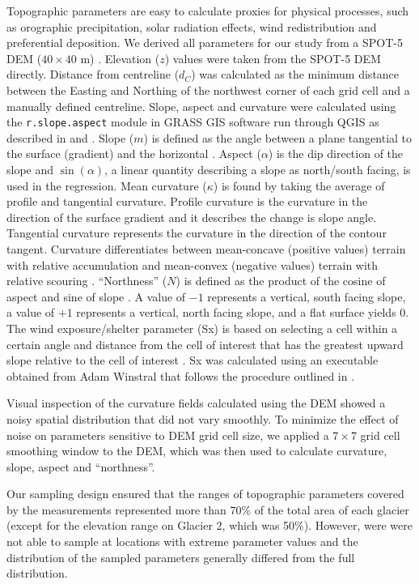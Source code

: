 \documentclass[review,oneside, letterpaper]{igs}
\begin{document}
Topographic parameters are easy to calculate proxies for physical processes, such as orographic precipitation, solar radiation effects, wind redistribution and preferential deposition. We derived all parameters for our study from a SPOT-5 DEM ($40\times40$ m) \citep{Korona2009}. Elevation ($z$) values were taken from the SPOT-5 DEM directly. Distance from centreline ($d_C$) was calculated as the minimum distance between the Easting and Northing of the northwest corner of each grid cell and a manually defined centreline. Slope, aspect and curvature were calculated using the \texttt{r.slope.aspect} module in GRASS GIS software run through QGIS as described in \cite{Mitavsova1993} and \cite{Hofierka2009}. Slope ($m$) is defined as the angle between a plane tangential to the surface (gradient) and the horizontal \citep{Olaya2009}. Aspect ($\alpha$) is the dip direction of the slope and $\sin(\alpha)$, a linear quantity describing a slope as north/south facing, is used in the regression. Mean curvature ($\kappa$) is found by taking the average of profile and tangential curvature. Profile curvature is the curvature in the direction of the surface gradient and it describes the change is slope angle. Tangential curvature represents the curvature in the direction of the contour tangent. Curvature differentiates between mean-concave (positive values) terrain with relative accumulation and mean-convex (negative values) terrain with relative scouring \citep{Olaya2009}. ``Northness'' ($N$) is defined as the product of the cosine of aspect and sine of slope \citep{Molotch2005}. A value of $-1$ represents a vertical, south facing slope, a value of $+1$ represents a vertical, north facing slope, and a flat surface yields 0. The wind exposure/shelter parameter (Sx) is based on selecting a cell within a certain angle and distance from the cell of interest that has the greatest upward slope relative to the cell of interest \citep{Winstral2002}. Sx was calculated using an executable obtained from Adam Winstral that follows the procedure outlined in \cite{Winstral2002}. 

Visual inspection of the curvature fields calculated using the DEM showed a noisy spatial
distribution that did not vary smoothly. To minimize the effect of noise on parameters sensitive to DEM grid cell size, we applied a $7\times7$ grid cell smoothing window to the DEM, which was then used to calculate curvature, slope, aspect and ``northness''.

Our sampling design ensured that the ranges of topographic parameters covered by the measurements represented more than 70\% of the total area of each glacier (except for the elevation range on Glacier 2, which was 50\%). However, were were not able to sample at locations with extreme parameter values and the distribution of the sampled parameters generally differed from the full distribution.
\end{document}

